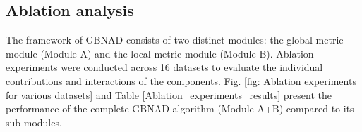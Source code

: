 \documentclass[times, review, 10pt]{elsarticle}
\begin{document}
\subsection{Ablation analysis}
The framework of GBNAD consists of two distinct modules: the global metric module (Module A) and the local metric module (Module B). Ablation experiments were conducted across 16 datasets to evaluate the individual contributions and interactions of the components. Fig. \ref{fig: Ablation experiments for various datasets} and Table \ref{Ablation_experiments_results} present the performance of the complete GBNAD algorithm (Module A+B) compared to its sub-modules. 

\begin{table}[!hb]
\centering
\caption{Quantitative comparison of runtime and AUC performance.}
\label{Ablation_experiments_results}
\end{table}
\end{document}
